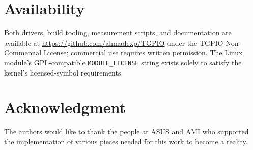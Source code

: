 \documentclass[conference,a4paper]{IEEEtran}
\begin{document}
\section*{Availability}

Both drivers, build tooling, measurement scripts, and documentation are
available at \url{https://github.com/ahmadexp/TGPIO} under the TGPIO
Non-Commercial License; commercial use requires written permission. The Linux
module's GPL-compatible \texttt{MODULE\_LICENSE} string exists solely to
satisfy the kernel's licensed-symbol requirements.

\section*{Acknowledgment}

The authors would like to thank the people at ASUS and AMI who supported the implementation of various pieces needed for this work to become a reality.



\end{document}
